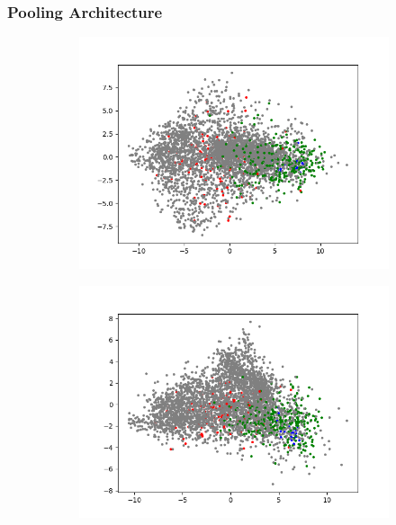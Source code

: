 \subsubsection{Pooling Architecture}

\begin{figure}[H]
    \centering
    \begin{subfigure}{.25\textwidth}
        \centering
        \includegraphics[width=\textwidth]{images/figures/experiments_latent/pooling_dim1024_PCA_classes.png}
    \end{subfigure}%
    \begin{subfigure}{.25\textwidth}
        \centering
        \includegraphics[width=\textwidth]{images/figures/experiments_latent/pooling_dim512_PCA_classes.png}

\end{subfigure}
\end{figure}
